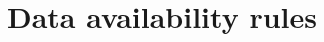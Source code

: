 \documentclass[../midgard.tex]{subfiles}
\begin{document}
\section{Data availability rules}
\label{h:data-availability-rules}
\end{document}
